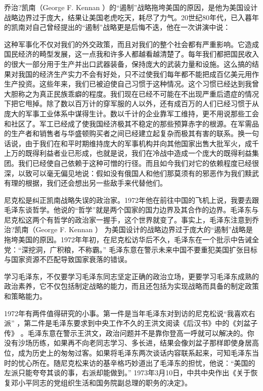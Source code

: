 \documentclass[UTF8, 12pt, a4paper]{ctexrep}
\begin{document}
乔治?凯南（George F. Kennan ）的“遏制”战略拖垮美国的原因，是他为美国设计战略边界过于庞大，结果让美国老虎吃天，耗尽了力气。20世纪80年代，已入暮年的凯南对自己曾经提出的“遏制”战略更是后悔不迭，他在一次讲演中说：

这种军事化不仅对我们的外交政策，而且对我们的整个社会都有严重影响。它造成国民经济的畸型发展，这一点我和许多人都越看越清楚了。每年我们都把国民收入的很大一部分用于生产并出口武器装备，保持庞大的武装力量和设施。这么搞的结果对我国的经济生产实力不会有好处，只不过使我们每年都不能把成百亿美元用作生产投资。这些年来，我们已被迫使自己习惯于这种情况。这个习惯已经达到我曾大胆称之为真正民族乖癖的程度。我们现在已经不可能在不出现严重后遗症的情况下把它甩掉。除了数以百万计的穿军服的人以外，还有成百万的人们已经习惯于从庞大的军事工业体系中谋得生计。数以千计的企业靠军工维持，更不用说那些工会和社区了。军工已经成了使我国经济极其不稳定的那些预算赤字的根源。在军需品的生产者和销售者与华盛顿购买者之间已经建立起复杂而极其有害的联系。换一句话说，由于我们在和平时期维持庞大的军事机构并向其他国家出售大批军火，成千上万的既得利益者业已形成，也就是说，我们在冷战中造成一个庞大的既得利益集团。我们已经使自己依赖于这种可憎的行径。而且如今我们对它的依赖程度已经很深，以致可以毫无偏见地说：假如没有俄国人和他们那莫须有的邪恶作为我们黩武有理的根据，我们还会想出另一些敌手来代替他们。

尼克松是纠正凯南战略失误的政治家。1972年他在前往中国的飞机上说，我要去跟毛泽东谈哲学。他说的“哲学”就是两个国家的国力边界及其合作的边界。毛泽东与尼克松这两个有哲学的政治家一握手，这个世界就变了。事实上，毛泽东注意到乔治?凯南（George F. Kennan ） 为美国设计的战略边界过于庞大的“遏制”战略是拖垮美国的原因。1972年年初，在尼克松访华后不久，毛泽东在一个批示中告诫全党：“深挖洞，广积粮，不称霸。” 毛泽东意在警示未来中国不要重犯美国扩张目标与国家资源不匹配导致国家衰落的错误。

学习毛泽东，不仅要学习毛泽东同志坚定正确的政治立场，更要学习毛泽东成熟的政治素养，它不仅包括制定战略的能力，而且还包括为实现战略而具备的制定政策和策略能力。

1972年有两件值得研究的小事。第一件是当年毛泽东对到访的尼克松说“我喜欢右派” ，第二件是毛泽东要求到中央工作不久的王洪文阅读《后汉书》中的《刘盆子传》 。毛泽东意在警示王洪文，政治问题并不是靠你登高一呼就可以解决的。你没有沙场历练，如果再不向老同志学习、多长进，结果会像刘盆子那样即使身居高位，成为历史上的匆匆过客。如果将毛泽东两次谈话内容联系起来，可知毛泽东当时的忧心所在。随尼克松来访的基辛格巧妙道出了毛泽东的担忧，他说：“美国的左派只能夸夸其谈的事，右派却能做到。” 1973年3月10日，中共中央作出《关于恢复邓小平同志的党组织生活和国务院副总理的职务的决定》。
\end{document}
